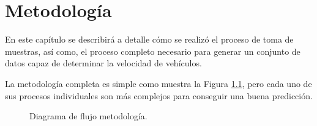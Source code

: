 \chapter{Metodología}

En este capítulo se describirá a detalle cómo se realizó el proceso de toma de muestras, así como, el proceso completo necesario para generar un conjunto de datos capaz de determinar la velocidad de vehículos.

La metodología completa es simple como muestra la Figura \ref{fig:MetodologiaDF}, pero cada uno de sus procesos individuales son más complejos para conseguir una buena predicción.


\begin{figure}[H]

    \centering
    \caption{Diagrama de flujo metodología.}
    \label{fig:MetodologiaDF}

\end{figure}





